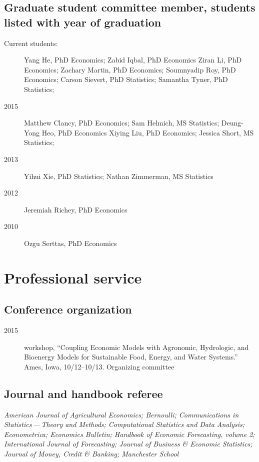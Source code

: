 \documentclass[12pt]{article}%
\newcommand{\allcaps}[1]{\textls{\MakeUppercase{#1}}}
\begin{document}
\subsection*{Graduate student committee member, students listed with year of graduation}

\begin{description}
\item[Current students:]
Yang He, PhD Economics;
Zabid Iqbal, PhD Economics
Ziran Li, PhD Economics;
Zachary Martin, PhD Economics;
Soumnyadip Roy, PhD Economics;
Carson Sievert, PhD Statistics;
Samantha Tyner, PhD Statistics;
\item[2015]
Matthew Clancy, PhD Economics;
Sam Helmich, MS Statistics;
Deung-Yong Heo, PhD Economics
Xiying Liu, PhD Economics;
Jessica Short, MS Statistics;
\item[2013]
Yihui Xie, PhD Statistics;
Nathan Zimmerman, MS Statistics
\item[2012] Jeremiah Richey, PhD Economics
\item[2010] Ozgu Serttas, PhD Economics
\end{description}

\section*{Professional service}

\subsection*{Conference organization}
\begin{description}
\item[2015] \allcaps{NSF} workshop, ``Coupling Economic Models with
Agronomic, Hydrologic, and Bioenergy Models for Sustainable Food,
Energy, and Water Systems.''  Ames, Iowa, 10/12--10/13. Organizing
committee
\end{description}

\subsection*{Journal and handbook referee}
\textit{American Journal of Agricultural Economics;
Bernoulli;
Communications in Statistics\,---\,Theory and Methods;
Computational Statistics and Data Analysis;
Econometrica;
Economics Bulletin;
Handbook of Economic Forecasting, volume 2;
International Journal of Forecasting;
Journal of Business \& Economic Statistics;
Journal of Money, Credit \& Banking;
Manchester School}
\end{document}
